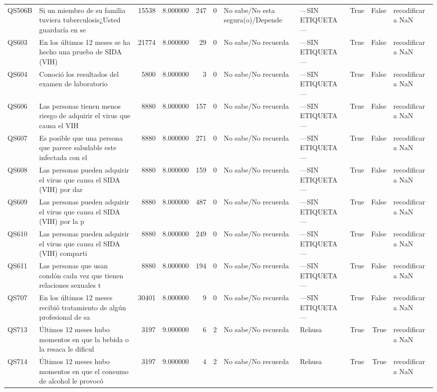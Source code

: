 \begin{longtable}{llrrrrllrrl}
QS506B & Si un miembro de su familia tuviera tuberculosis¿Usted guardaría en se & 15538 & 8.000000 & 247 & 0 & No sabe/No esta segura(o)/Depende & —SIN ETIQUETA— & True & False & recodificar a NaN \\
QS603 & En los últimos 12 meses se ha hecho una prueba de SIDA (VIH) & 21774 & 8.000000 & 29 & 0 & No sabe/No recuerda & —SIN ETIQUETA— & True & False & recodificar a NaN \\
QS604 & Conoció los resultados del examen de laboratorio & 5800 & 8.000000 & 3 & 0 & No sabe/No recuerda & —SIN ETIQUETA— & True & False & recodificar a NaN \\
QS606 & Las personas tienen menos riesgo de adquirir el virus que causa el VIH & 8880 & 8.000000 & 157 & 0 & No sabe/No recuerda & —SIN ETIQUETA— & True & False & recodificar a NaN \\
QS607 & Es posible que una persona que parece saludable este infectada con el  & 8880 & 8.000000 & 271 & 0 & No sabe/No recuerda & —SIN ETIQUETA— & True & False & recodificar a NaN \\
QS608 & Las personas pueden adquirir el virus que causa el SIDA (VIH) por dar  & 8880 & 8.000000 & 159 & 0 & No sabe/No recuerda & —SIN ETIQUETA— & True & False & recodificar a NaN \\
QS609 & Las personas pueden adquirir el virus que causa el SIDA (VIH) por la p & 8880 & 8.000000 & 487 & 0 & No sabe/No recuerda & —SIN ETIQUETA— & True & False & recodificar a NaN \\
QS610 & Las personas pueden adquirir el virus que causa el SIDA (VIH) comparti & 8880 & 8.000000 & 249 & 0 & No sabe/No recuerda & —SIN ETIQUETA— & True & False & recodificar a NaN \\
QS611 & Las personas que usan condón cada vez que tienen relaciones sexuales t & 8880 & 8.000000 & 194 & 0 & No sabe/No recuerda & —SIN ETIQUETA— & True & False & recodificar a NaN \\
QS707 & En los últimos 12 meses recibió tratamiento de algún profesional de sa & 30401 & 8.000000 & 9 & 0 & No sabe/No recuerda & —SIN ETIQUETA— & True & False & recodificar a NaN \\
QS713 & Últimos 12 meses hubo momentos en que la bebida o la resaca le dificul & 3197 & 9.000000 & 6 & 2 & No sabe/No recuerda & Rehusa & True & True & recodificar a NaN \\
QS714 & Últimos 12 meses hubo momentos en que el consumo de alcohol le provocó & 3197 & 9.000000 & 4 & 2 & No sabe/No recuerda & Rehusa & True & True & recodificar a NaN \\

\end{longtable}
